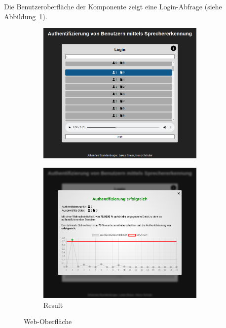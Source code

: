 Die Benutzeroberfläche der  Komponente zeigt eine Login-Abfrage (siehe Abbildung~\ref{fig:AppLogin}).
\begin{figure}[H]
    \begin{subfigure}[c]{0.49\textwidth}
        \centering
        \includegraphics[width=0.9\textwidth, keepaspectratio]{images/UI.png}
        \label{fig:AppLogin}
    \end{subfigure}
    \begin{subfigure}[c]{0.49\textwidth}
        \centering
        \includegraphics[width=0.9\textwidth, keepaspectratio]{images/UIResult.png}
        \caption{Result}
        \label{fig:Result}
    \end{subfigure}
    \caption{Web-Oberfläche}
\end{figure}
